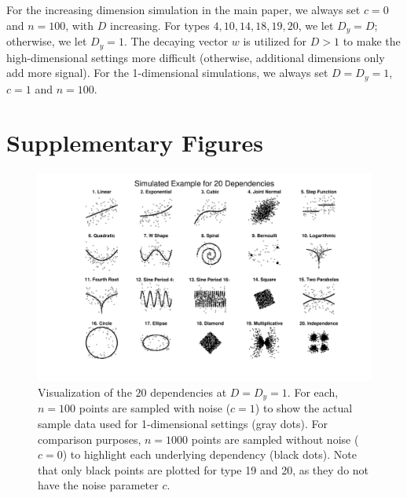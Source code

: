 \documentclass[11pt]{article}
\begin{document}
For the increasing dimension simulation in the main paper, we always set $c=0$ and $n=100$, with $D$ increasing.  For types  $4,10,14,18,19,20$, we let $D_y=D$; otherwise, we let $D_y=1$. 
The decaying vector $w$ is utilized for $D>1$ to make the high-dimensional settings more difficult (otherwise, additional dimensions only add more signal).
For the 1-dimensional simulations, we always set $D=D_y=1$, $c=1$ and $n=100$.

\clearpage

\section{Supplementary Figures}
\label{appen:figs}

\begin{figure}[htbp]
\includegraphics[trim={5cm 1.5cm 4cm 0.5cm},clip, width=1.0\textwidth]{Figures/FigSimVisual}
\caption{Visualization of the $20$ dependencies at $D=D_{y}=1$. For each, $n=100$ points are sampled with noise ($c=1$) to show the actual sample data used for 1-dimensional settings (gray dots). For comparison purposes, $n=1000$ points are sampled without noise ($c=0$) to highlight each underlying dependency (black dots). Note that only black points are plotted for type 19 and 20, as they do not have the noise parameter $c$.
}
\label{f:dependencies}
\end{figure}
\end{document}
